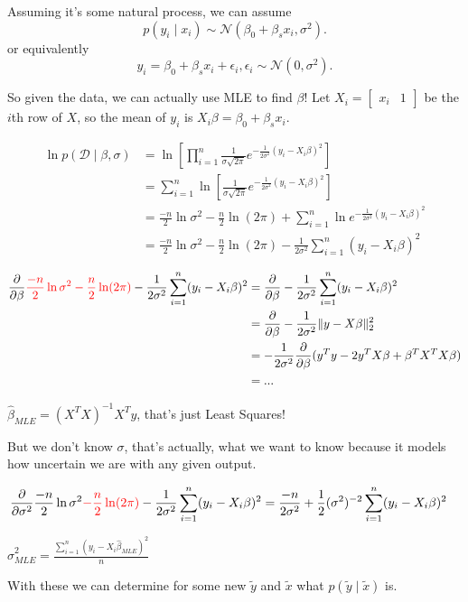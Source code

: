 Assuming it's some natural process, we can assume 
\[p(y_i\mid x_i) \sim \mathcal{N}(\beta_0 + \beta_s x_i, \sigma^2).\]
or equivalently
\[y_i = \beta_0 + \beta_s x_i + \epsilon_i, \epsilon_i \sim \mathcal{N}(0,\sigma^2).\]

So given the data, we can actually use MLE to find $\beta$!
Let $X_i=\begin{bmatrix}x_i & 1\end{bmatrix}$ be the $i$th row of $X$, so the mean of $y_i$ is $X_i\beta=\beta_0+\beta_s x_i$.

\begin{align*}
\ln p(\mathcal{D}\mid \beta, \sigma) &= \ln \left[\prod_{i=1}^{n} \frac{1}{\sigma\sqrt{2\pi}} e^{-\frac{1}{2\sigma^2}(y_i-X_i\beta)^2}\right]\\
	&= \sum_{i=1}^{n} \ln \left[\frac{1}{\sigma\sqrt{2\pi}} e^{-\frac{1}{2\sigma^2}(y_i-X_i\beta)^2}\right]\\
	&= \frac{-n}{2}\ln \sigma^2 - \frac{n}{2}\ln(2\pi) + \sum_{i=1}^{n} \ln e^{-\frac{1}{2\sigma^2}(y_i-X_i\beta)^2}\\
	&= \frac{-n}{2}\ln \sigma^2 - \frac{n}{2}\ln(2\pi) -\frac{1}{2\sigma^2}\sum_{i=1}^{n} (y_i-X_i\beta)^2
\end{align*}

\begin{align*}
\frac{\partial}{\partial\beta} {\color{red}\frac{-n}{2}\ln \sigma^2 - \frac{n}{2}\ln(2\pi)} -\frac{1}{2\sigma^2}\sum_{i=1}^{n} (y_i-X_i\beta)^2 &= \frac{\partial}{\partial\beta} -\frac{1}{2\sigma^2}\sum_{i=1}^{n} (y_i-X_i\beta)^2\\
&=  \frac{\partial}{\partial\beta} -\frac{1}{2\sigma^2} \|y-X\beta\|_2^2\\
&= -\frac{1}{2\sigma^2}  \frac{\partial}{\partial\beta} (y^Ty-2y^TX\beta+\beta^TX^TX\beta)\\
&= ... \\
\end{align*}

$\hat\beta_{MLE} = (X^TX)^{-1}X^Ty$, that's just Least Squares!

But we don't know $\sigma$, that's actually, what we want to know because it models how uncertain we are with any given output.

\begin{align*}
\frac{\partial}{\partial\sigma^2} \frac{-n}{2}\ln \sigma^2 {\color{red}- \frac{n}{2}\ln(2\pi)} -\frac{1}{2\sigma^2}\sum_{i=1}^{n} (y_i-X_i\beta)^2 &= \frac{-n}{2\sigma^2} +\frac{1}{2}(\sigma^2)^{-2}\sum_{i=1}^{n} (y_i-X_i\beta)^2
\end{align*}

$\hat\sigma^2_{MLE} = \frac{\sum_{i=1}^{n} (y_i-X_i\hat\beta_{MLE})^2}{n}$

With these we can determine for some new $\tilde y$ and $\tilde x$ what $p(\tilde y \mid \tilde x)$ is. 

